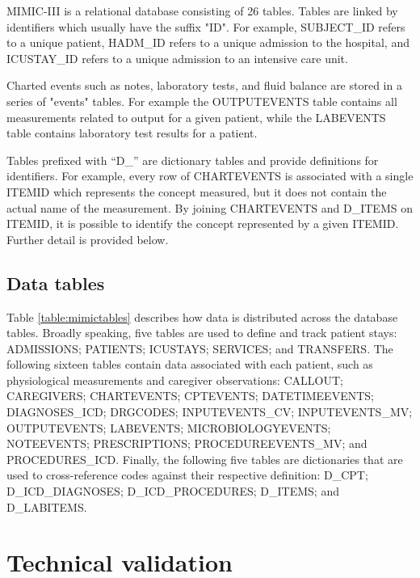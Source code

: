 \documentclass[english]{article}
\begin{document}

MIMIC-III is a relational database consisting of 26 tables. Tables are linked by identifiers which usually have the suffix "ID". For example, SUBJECT\_ID refers to a unique patient, HADM\_ID refers to a unique admission to the hospital, and ICUSTAY\_ID refers to a unique admission to an intensive care unit.

Charted events such as notes, laboratory tests, and fluid balance are stored in a series of "events" tables. For example the OUTPUTEVENTS table contains all measurements related to output for a given patient, while the LABEVENTS table contains laboratory test results for a patient.

Tables prefixed with “D\_” are dictionary tables and provide definitions for identifiers. For example, every row of CHARTEVENTS is associated with a single ITEMID which represents the concept measured, but it does not contain the actual name of the measurement. By joining CHARTEVENTS and D\_ITEMS on ITEMID, it is possible to identify the concept represented by a given ITEMID. Further detail is provided below.

\subsection*{Data tables}

Table \ref{table:mimictables} describes how data is distributed across the database tables. Broadly speaking, five tables are used to define and track patient stays: ADMISSIONS; PATIENTS; ICUSTAYS; SERVICES; and TRANSFERS. The following sixteen tables contain data associated with each patient, such as physiological measurements and caregiver observations: CALLOUT; CAREGIVERS; CHARTEVENTS; CPTEVENTS; DATETIMEEVENTS; DIAGNOSES\_ICD; DRGCODES; INPUTEVENTS\_CV; INPUTEVENTS\_MV; OUTPUTEVENTS; LABEVENTS; MICROBIOLOGYEVENTS; NOTEEVENTS; PRESCRIPTIONS; PROCEDUREEVENTS\_MV; and PROCEDURES\_ICD. Finally, the following five tables are dictionaries that are used to cross-reference codes against their respective definition: D\_CPT; D\_ICD\_DIAGNOSES; D\_ICD\_PROCEDURES; D\_ITEMS; and D\_LABITEMS.

\section*{Technical validation}

\end{document}
